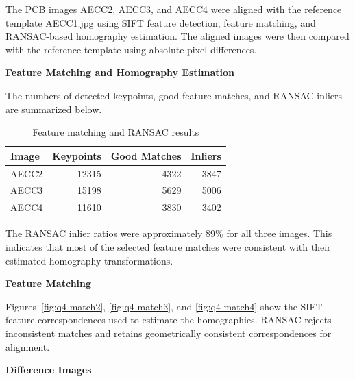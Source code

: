 \documentclass[10pt,a4paper]{article}
\begin{document}
The PCB images AECC2, AECC3, and AECC4 were aligned with the reference template AECC1.jpg using SIFT feature detection, feature matching, and RANSAC-based homography estimation. The aligned images were then compared with the reference template using absolute pixel differences.

\textbf{Feature Matching and Homography Estimation}

The numbers of detected keypoints, good feature matches, and RANSAC inliers are summarized below.

\begin{table}[H]
\raggedright
\caption{Feature matching and RANSAC results}
\begin{tabular}{lrrr}
\hline
Image & Keypoints & Good Matches & Inliers \\
\hline
AECC2 & 12315 & 4322 & 3847 \\
AECC3 & 15198 & 5629 & 5006 \\
AECC4 & 11610 & 3830 & 3402 \\
\hline
\end{tabular}
\end{table}

The RANSAC inlier ratios were approximately 89\% for all three images. This indicates that most of the selected feature matches were consistent with their estimated homography transformations.

\textbf{Feature Matching}

Figures~\ref{fig:q4-match2}, \ref{fig:q4-match3}, and \ref{fig:q4-match4} show the SIFT feature correspondences used to estimate the homographies. RANSAC rejects inconsistent matches and retains geometrically consistent correspondences for alignment.

\textbf{Difference Images}
\end{document}
